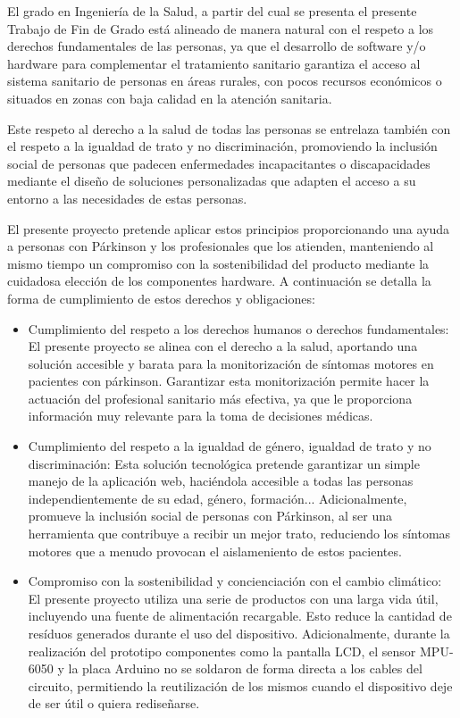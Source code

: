 
El grado en Ingeniería de la Salud, a partir del cual se presenta el presente Trabajo de Fin de Grado está alineado de manera natural con el respeto a los derechos fundamentales de las personas, ya que el desarrollo de software y/o hardware para complementar el tratamiento sanitario garantiza el acceso al sistema sanitario de personas en áreas rurales, con pocos recursos económicos o situados en zonas con baja calidad en la atención sanitaria. 

Este respeto al derecho a la salud de todas las personas se entrelaza también con el respeto a la igualdad de trato y no discriminación, promoviendo la inclusión social de personas que padecen enfermedades incapacitantes o discapacidades mediante el diseño de soluciones personalizadas que adapten el acceso a su entorno a las necesidades de estas personas.

El presente proyecto pretende aplicar estos principios proporcionando una ayuda a personas con Párkinson y los profesionales que los atienden, manteniendo al mismo tiempo un compromiso con la sostenibilidad del producto mediante la cuidadosa elección de los componentes hardware. A continuación se detalla la forma de cumplimiento de estos derechos y obligaciones:
\begin{itemize}
    \item Cumplimiento del respeto a los derechos humanos o derechos fundamentales: El presente proyecto se alinea con el derecho a la salud, aportando una solución accesible y barata para la monitorización de síntomas motores en pacientes con párkinson. Garantizar esta monitorización permite hacer la actuación del profesional sanitario más efectiva, ya que le proporciona información muy relevante para la toma de decisiones médicas.
    \item Cumplimiento del respeto a la igualdad de género, igualdad de trato y no discriminación: Esta solución tecnológica pretende garantizar un simple manejo de la aplicación web, haciéndola accesible a todas las personas independientemente de su edad, género, formación... Adicionalmente, promueve la inclusión social de personas con Párkinson, al ser una herramienta que contribuye a recibir un mejor trato, reduciendo los síntomas motores que a menudo provocan el aislameniento de estos pacientes.
    \item Compromiso con la sostenibilidad y concienciación con el cambio climático: El presente proyecto utiliza una serie de productos con una larga vida útil, incluyendo una fuente de alimentación recargable. Esto reduce la cantidad de resíduos generados durante el uso del dispositivo. Adicionalmente, durante la realización del prototipo componentes como la pantalla LCD, el sensor MPU-6050 y la placa Arduino no se soldaron de forma directa a los cables del circuito, permitiendo la reutilización de los mismos cuando el dispositivo deje de ser útil o quiera rediseñarse.
\end{itemize}
